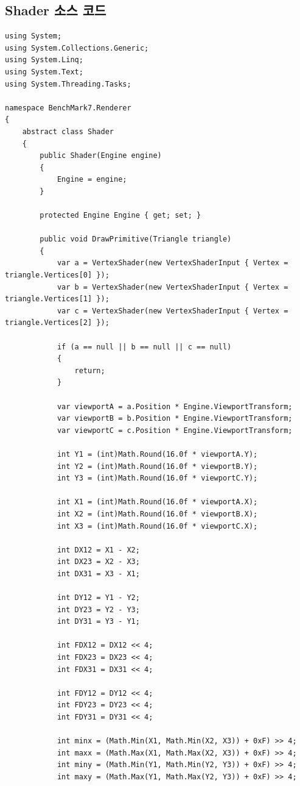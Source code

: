 \documentclass[a4paper,itemph,amsmath,oneside,11pt,openany]{xoblivoir}
\begin{document}
\subsection{Shader 소스 코드}
\begin{verbatim}
using System;
using System.Collections.Generic;
using System.Linq;
using System.Text;
using System.Threading.Tasks;

namespace BenchMark7.Renderer
{
    abstract class Shader
    {
        public Shader(Engine engine)
        {
            Engine = engine;
        }

        protected Engine Engine { get; set; }

        public void DrawPrimitive(Triangle triangle)
        {
            var a = VertexShader(new VertexShaderInput { Vertex = triangle.Vertices[0] });
            var b = VertexShader(new VertexShaderInput { Vertex = triangle.Vertices[1] });
            var c = VertexShader(new VertexShaderInput { Vertex = triangle.Vertices[2] });

            if (a == null || b == null || c == null)
            {
                return;
            }

            var viewportA = a.Position * Engine.ViewportTransform;
            var viewportB = b.Position * Engine.ViewportTransform;
            var viewportC = c.Position * Engine.ViewportTransform;

            int Y1 = (int)Math.Round(16.0f * viewportA.Y);
            int Y2 = (int)Math.Round(16.0f * viewportB.Y);
            int Y3 = (int)Math.Round(16.0f * viewportC.Y);

            int X1 = (int)Math.Round(16.0f * viewportA.X);
            int X2 = (int)Math.Round(16.0f * viewportB.X);
            int X3 = (int)Math.Round(16.0f * viewportC.X);

            int DX12 = X1 - X2;
            int DX23 = X2 - X3;
            int DX31 = X3 - X1;

            int DY12 = Y1 - Y2;
            int DY23 = Y2 - Y3;
            int DY31 = Y3 - Y1;

            int FDX12 = DX12 << 4;
            int FDX23 = DX23 << 4;
            int FDX31 = DX31 << 4;

            int FDY12 = DY12 << 4;
            int FDY23 = DY23 << 4;
            int FDY31 = DY31 << 4;

            int minx = (Math.Min(X1, Math.Min(X2, X3)) + 0xF) >> 4;
            int maxx = (Math.Max(X1, Math.Max(X2, X3)) + 0xF) >> 4;
            int miny = (Math.Min(Y1, Math.Min(Y2, Y3)) + 0xF) >> 4;
            int maxy = (Math.Max(Y1, Math.Max(Y2, Y3)) + 0xF) >> 4;


\end{verbatim}
\end{document}
